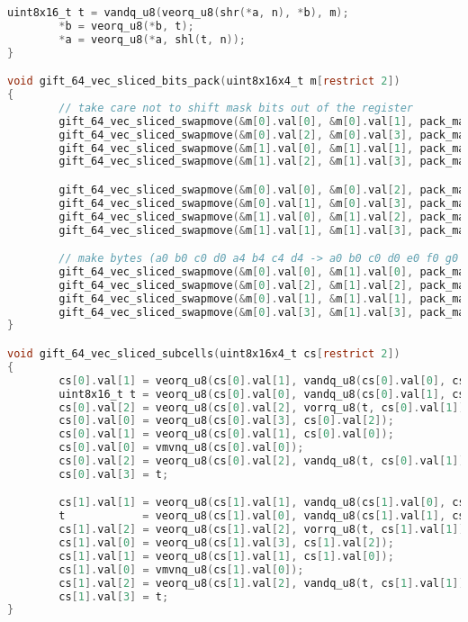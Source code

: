 \begin{lstlisting}[language=c, caption={gift\_vec\_sliced.c}]
        uint8x16_t t = vandq_u8(veorq_u8(shr(*a, n), *b), m);
        *b = veorq_u8(*b, t);
        *a = veorq_u8(*a, shl(t, n));
}

void gift_64_vec_sliced_bits_pack(uint8x16x4_t m[restrict 2])
{
        // take care not to shift mask bits out of the register
        gift_64_vec_sliced_swapmove(&m[0].val[0], &m[0].val[1], pack_mask_0, 1);
        gift_64_vec_sliced_swapmove(&m[0].val[2], &m[0].val[3], pack_mask_0, 1);
        gift_64_vec_sliced_swapmove(&m[1].val[0], &m[1].val[1], pack_mask_0, 1);
        gift_64_vec_sliced_swapmove(&m[1].val[2], &m[1].val[3], pack_mask_0, 1);

        gift_64_vec_sliced_swapmove(&m[0].val[0], &m[0].val[2], pack_mask_1, 2);
        gift_64_vec_sliced_swapmove(&m[0].val[1], &m[0].val[3], pack_mask_1, 2);
        gift_64_vec_sliced_swapmove(&m[1].val[0], &m[1].val[2], pack_mask_1, 2);
        gift_64_vec_sliced_swapmove(&m[1].val[1], &m[1].val[3], pack_mask_1, 2);

        // make bytes (a0 b0 c0 d0 a4 b4 c4 d4 -> a0 b0 c0 d0 e0 f0 g0 h0)
        gift_64_vec_sliced_swapmove(&m[0].val[0], &m[1].val[0], pack_mask_2, 4);
        gift_64_vec_sliced_swapmove(&m[0].val[2], &m[1].val[2], pack_mask_2, 4);
        gift_64_vec_sliced_swapmove(&m[0].val[1], &m[1].val[1], pack_mask_2, 4);
        gift_64_vec_sliced_swapmove(&m[0].val[3], &m[1].val[3], pack_mask_2, 4);
}

void gift_64_vec_sliced_subcells(uint8x16x4_t cs[restrict 2])
{
        cs[0].val[1] = veorq_u8(cs[0].val[1], vandq_u8(cs[0].val[0], cs[0].val[2]));
        uint8x16_t t = veorq_u8(cs[0].val[0], vandq_u8(cs[0].val[1], cs[0].val[3]));
        cs[0].val[2] = veorq_u8(cs[0].val[2], vorrq_u8(t, cs[0].val[1]));
        cs[0].val[0] = veorq_u8(cs[0].val[3], cs[0].val[2]);
        cs[0].val[1] = veorq_u8(cs[0].val[1], cs[0].val[0]);
        cs[0].val[0] = vmvnq_u8(cs[0].val[0]);
        cs[0].val[2] = veorq_u8(cs[0].val[2], vandq_u8(t, cs[0].val[1]));
        cs[0].val[3] = t;

        cs[1].val[1] = veorq_u8(cs[1].val[1], vandq_u8(cs[1].val[0], cs[1].val[2]));
        t            = veorq_u8(cs[1].val[0], vandq_u8(cs[1].val[1], cs[1].val[3]));
        cs[1].val[2] = veorq_u8(cs[1].val[2], vorrq_u8(t, cs[1].val[1]));
        cs[1].val[0] = veorq_u8(cs[1].val[3], cs[1].val[2]);
        cs[1].val[1] = veorq_u8(cs[1].val[1], cs[1].val[0]);
        cs[1].val[0] = vmvnq_u8(cs[1].val[0]);
        cs[1].val[2] = veorq_u8(cs[1].val[2], vandq_u8(t, cs[1].val[1]));
        cs[1].val[3] = t;
}


\end{lstlisting}
